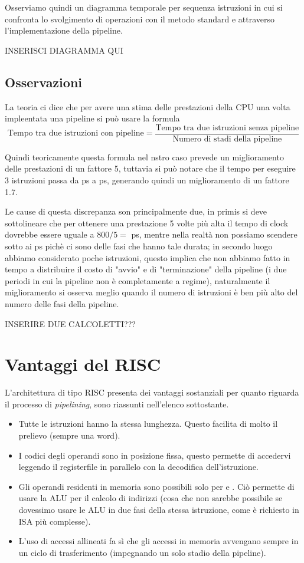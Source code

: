 \documentclass[class=book, crop=false, oneside]{standalone}
\begin{document}
Osserviamo quindi un diagramma temporale per sequenza istruzioni in cui si confronta lo svolgimento di operazioni con il metodo standard e attraverso l'implementazione della pipeline.

INSERISCI DIAGRAMMA QUI


\subsection{Osservazioni}
La teoria ci dice che per avere una stima delle prestazioni della CPU una volta impleentata una pipeline si può usare la formula \[\text{Tempo tra due istruzioni con pipeline} = \frac{\text{Tempo tra due istruzioni senza pipeline}}{\text{Numero di stadi della pipeline}}\]

Quindi teoricamente questa formula nel nstro caso prevede un miglioramento delle prestazioni di un fattore 5, tuttavia si può notare che il tempo per eseguire 3 istruzioni passa da \unit[2400]{ps} a \unit[1400]{ps}, generando quindi un miglioramento di un fattore 1.7.

Le cause di questa discrepanza son principalmente due, in primis si deve sottolineare che per ottenere una prestazione 5 volte più alta il tempo di clock dovrebbe essere uguale a \(800/5=\) \unit[160]{ps}, mentre nella realtà non possiamo scendere sotto ai \unit[200]{ps} pichè ci sono delle fasi che hanno tale durata; in secondo luogo abbiamo considerato poche istruzioni, questo implica che non abbiamo fatto in tempo a distribuire il costo di "avvio" e di "terminazione" della pipeline (i due periodi in cui la pipeline non è completamente a regime), naturalmente il miglioramento si osserva meglio quando il numero di istruzioni è ben più alto del numero delle fasi della pipeline.

INSERIRE DUE CALCOLETTI???

\section{Vantaggi del RISC}
L'architettura di tipo RISC presenta dei vantaggi sostanziali per quanto riguarda il processo di \emph{pipelining}, sono riassunti nell'elenco sottostante.
\begin{itemize}
	\item Tutte le istruzioni hanno la stessa lunghezza. Questo facilita di molto il prelievo (sempre una word).
	\item I codici degli operandi sono in posizione fissa, questo permette di accedervi leggendo il registerfile in parallelo con la decodifica dell’istruzione.
	\item Gli operandi residenti in memoria sono possibili solo per  e . Ciò permette di usare la ALU per il calcolo di indirizzi (cosa che non sarebbe possibile se dovessimo usare le ALU in due fasi della stessa istruzione, come è richiesto in ISA più complesse).
	\item  L’uso di accessi allineati fa sì che gli accessi in memoria avvengano sempre in un ciclo di trasferimento (impegnando un solo stadio della pipeline).
\end{itemize}
\end{document}
